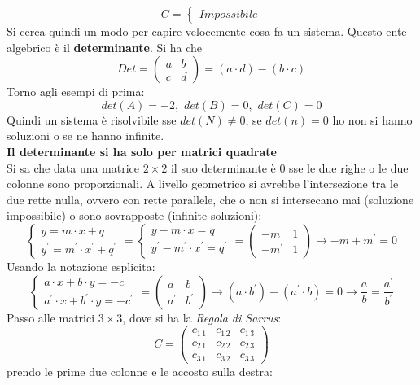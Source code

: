 \documentclass[a4paper,12pt, oneside]{book}
\begin{document}
$$
C=\begin{cases}
Impossibile
\end{cases}
$$
Si cerca quindi un modo per capire velocemente cosa fa un sistema. Questo ente algebrico è il \textbf{determinante}.
Si ha che
$$
Det=\left(
\begin{matrix}
a & b\\
c & d
\end{matrix}
\right)=(a\cdot d)-(b\cdot c)
$$ 
Torno agli esempi di prima:
$$det(A)=-2,\,\, det(B)=0,\,\,det(C)=0$$
Quindi un sistema è risolvibile sse $det(N)\neq 0$, se $det(n)=0$ ho non si hanno soluzioni o se ne hanno infinite.\\
\textbf{Il determinante si ha solo per matrici quadrate}\\
Si sa che data una matrice $2\times 2$ il suo determinante è 0 sse le due righe o le due colonne sono proporzionali. A livello geometrico si avrebbe l'intersezione tra le due rette nulla, ovvero con rette parallele, che o non si intersecano mai (soluzione impossibile) o sono sovrapposte (infinite soluzioni): 
$$\begin{cases}
y=m\cdot x+q\\
y^{'}=m^{'}\cdot x^{'}+q^{'}
\end{cases}=
\begin{cases}
y-m\cdot x=q\\
y^{'}-m^{'}\cdot x^{'}=q^{'}
\end{cases}=
\left(
\begin{matrix}
-m & 1\\
-m^{'} & 1
\end{matrix}
\right)\rightarrow -m+m^{'}=0
$$
Usando la notazione esplicita:
$$
\begin{cases}
a\cdot x+b\cdot y=-c\\
a^{'}\cdot x+b^{'}\cdot y=-c^{'}
\end{cases}=
\left(
\begin{matrix}
a & b\\
a^{'} & b^{'}
\end{matrix}
\right)\rightarrow (a\cdot b^{'})-(a^{'}\cdot b)=0\rightarrow \frac{a}{b}=\frac{a^{'}}{b^{'}}
$$
Passo alle matrici $3\times 3$, dove si ha la \textit{Regola di Sarrus}:
$$
C=\left(\begin{matrix}
c_{1\,1} & c_{1\,2}  & c_{1\,3}\\
c_{2\,1} & c_{2\,2} & c_{2\,3}\\
c_{3\,1} & c_{3\,2} & c_{3\,3}
\end{matrix}\right)
$$
prendo le prime due colonne e le accosto sulla destra:
\end{document}
